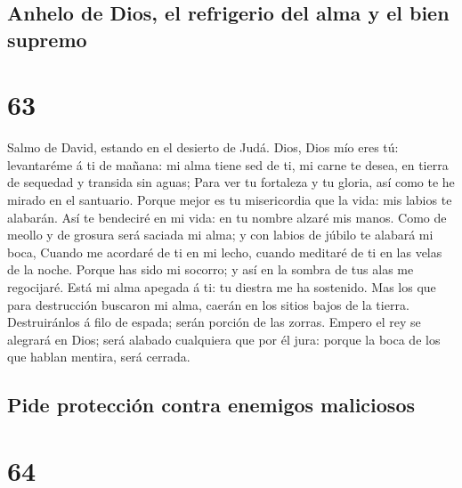 \hypertarget{anhelo-de-dios-el-refrigerio-del-alma-y-el-bien-supremo}{%
\subsection{Anhelo de Dios, el refrigerio del alma y el bien
supremo}\label{anhelo-de-dios-el-refrigerio-del-alma-y-el-bien-supremo}}

\hypertarget{section-62}{%
\section{63}\label{section-62}}

 Salmo de David, estando en el desierto de Judá. Dios,
Dios mío eres tú: levantaréme á ti de mañana: mi alma tiene sed de ti,
mi carne te desea, en tierra de sequedad y transida sin aguas;
 Para ver tu fortaleza y tu gloria, así como te he mirado
en el santuario.  Porque mejor es tu misericordia que la
vida: mis labios te alabarán.  Así te bendeciré en mi
vida: en tu nombre alzaré mis manos.  Como de meollo y de
grosura será saciada mi alma; y con labios de júbilo te alabará mi boca,
 Cuando me acordaré de ti en mi lecho, cuando meditaré de
ti en las velas de la noche.  Porque has sido mi socorro;
y así en la sombra de tus alas me regocijaré.  Está mi
alma apegada á ti: tu diestra me ha sostenido.  Mas los
que para destrucción buscaron mi alma, caerán en los sitios bajos de la
tierra.  Destruiránlos á filo de espada; serán porción de
las zorras.  Empero el rey se alegrará en Dios; será
alabado cualquiera que por él jura: porque la boca de los que hablan
mentira, será cerrada.

\hypertarget{pide-protecciuxf3n-contra-enemigos-maliciosos}{%
\subsection{Pide protección contra enemigos
maliciosos}\label{pide-protecciuxf3n-contra-enemigos-maliciosos}}

\hypertarget{section-63}{%
\section{64}\label{section-63}}

